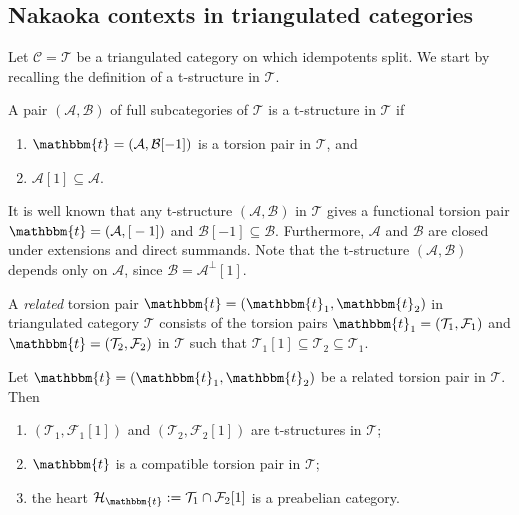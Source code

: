 
\subsection{Nakaoka contexts in triangulated categories}

Let $\mathscr{C}=\mathcal{T}$ be a triangulated category on which idempotents split.
We start by recalling the definition of a t-structure in $\mathcal{T}$.

\begin{definition}
  A pair $(\mathcal{A},\mathcal{B})$ of full subcategories of $\mathcal{T}$ is a t-structure
  in $\mathcal{T}$ if
  \begin{enumerate}[label=(\alph*)]
    \item $\mathbbm{t}=(\mathcal{A},\mathcal{B}[-1])$ is a torsion pair in $\mathcal{T}$, and
    \item $\mathcal{A}[1]\subseteq \mathcal{A}$.
  \end{enumerate}
\end{definition}

\begin{rmk}
  It is well known that any t-structure $(\mathcal{A},\mathcal{B})$ in $\mathcal{T}$
  gives a functional torsion pair $\mathbbm{t}=(\mathcal{A},\mathcal[-1])$ and
  $\mathcal{B}[-1]\subseteq\mathcal{B}$. Furthermore, $\mathcal{A}$ and
  $\mathcal{B}$ are closed under extensions and direct summands. Note that the t-structure
  $(\mathcal{A},\mathcal{B})$ depends only on $\mathcal{A}$, since $\mathcal{B}=\mathcal{A}^\perp[1]$.
\end{rmk}

\begin{definition}
  A \emph{related} torsion pair $\mathbbm{t}=(\mathbbm{t}_1,\mathbbm{t}_2)$ in triangulated category
  $\mathcal{T}$ consists of the torsion pairs $\mathbbm{t}_1=(\mathcal{T}_1,\mathcal{F}_1)$
  and $\mathbbm{t}=(\mathcal{T}_2,\mathcal{F}_2)$ in $\mathcal{T}$ such that
  $\mathcal{T}_1[1]\subseteq \mathcal{T}_2\subseteq\mathcal{T}_1$.
\end{definition}


\begin{prop}
  Let $\mathbbm{t}=(\mathbbm{t}_1,\mathbbm{t}_2)$ be a related torsion pair in $\mathcal{T}$. Then
  \begin{enumerate}[label=(\alph*)]
    \item $(\mathcal{T}_1,\mathcal{F}_1[1])$ and $(\mathcal{T}_2,\mathcal{F}_2[1])$
    are t-structures in $\mathcal{T}$;
  \item $\mathbbm{t}$ is a compatible torsion pair in $\mathcal{T}$; 
    \item the heart $\mathcal{H}_\mathbbm{t} := \mathcal{T}_1\cap\mathcal{F}_2[1]$ is a preabelian category.
  \end{enumerate}
\end{prop}

